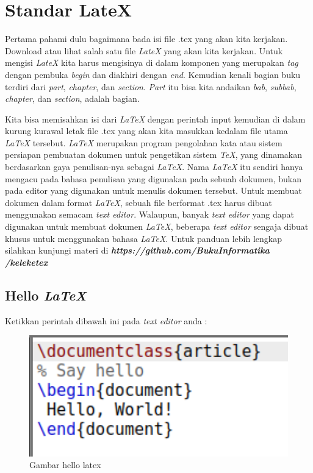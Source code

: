 \chapter{Standar LateX}

Pertama pahami dulu bagaimana bada isi file .tex yang akan kita kerjakan. Download atau lihat salah satu file \textit{LateX} yang akan kita kerjakan. Untuk mengisi \textit{LateX} kita harus mengisinya di dalam komponen yang merupakan \textit{tag} dengan pembuka \textit{begin} dan diakhiri dengan \textit{end}. Kemudian kenali bagian buku terdiri dari \textit{part}, \textit{chapter}, dan \textit{section}. \textit{Part} itu bisa kita andaikan \textit{bab}, \textit{subbab}, \textit{chapter}, dan \textit{section}, adalah bagian.

Kita bisa memisahkan isi dari \textit{LaTeX} dengan perintah input kemudian di dalam kurung kurawal letak file .tex yang akan kita masukkan kedalam file utama \textit{LaTeX} tersebut. \textit{LaTeX} merupakan program pengolahan kata atau sistem persiapan pembuatan dokumen untuk pengetikan sistem \textit{TeX}, yang dinamakan berdasarkan gaya penulisan-nya sebagai \textit{LaTeX}. Nama \textit{LaTeX} itu sendiri hanya mengacu pada bahasa penulisan yang digunakan pada sebuah dokumen, bukan pada editor yang digunakan untuk menulis dokumen tersebut. Untuk membuat dokumen dalam format \textit{LaTeX}, sebuah file berformat .tex harus dibuat menggunakan semacam \textit{text editor}. Walaupun, banyak \textit{text editor} yang dapat digunakan untuk membuat dokumen \textit{LaTeX}, beberapa \textit{text editor} sengaja dibuat khusus untuk menggunakan bahasa \textit{LaTeX}. Untuk panduan lebih lengkap silahkan kunjungi materi di \textbf{\textit{https://github.com/BukuInformatika
/keleketex}}

\section{Hello \textit{LaTeX}}
Ketikkan perintah dibawah ini pada \textit{text editor} anda :
		\begin{figure}[H]
		\centering
		\includegraphics[width=1\textwidth]{figures/hello.png}
		\caption{Gambar hello latex}
		\end{figure}


